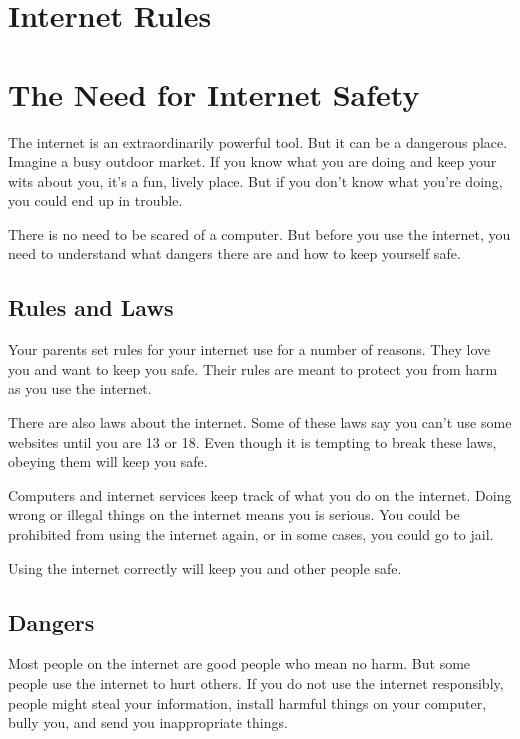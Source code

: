 
\chapter{Internet Rules}



\chapter{The Need for Internet Safety}


The internet is an extraordinarily powerful tool. But it can be a dangerous place. Imagine a busy outdoor market. If you know what you are doing and keep your wits about you, it's a fun, lively place. But if you don't know what you're doing, you could end up in trouble.

There is no need to be scared of a computer. But before you use the internet, you need to understand what dangers there are and how to keep yourself safe.

\section*{Rules and Laws}

Your parents set rules for your internet use for a number of reasons. They love you and want to keep you safe. Their rules are meant to protect you from harm as you use the internet.

There are also laws about the internet. Some of these laws say you can't use some websites until you are 13 or 18. Even though it is tempting to break these laws, obeying them will keep you safe.

Computers and internet services keep track of what you do on the internet. Doing wrong or illegal things on the internet means you is serious. You could be prohibited from using the internet again, or in some cases, you could go to jail.

Using the internet correctly will keep you and other people safe.

\section*{Dangers}

Most people on the internet are good people who mean no harm. But some people use the internet to hurt others. If you do not use the internet responsibly, people might steal your information, install harmful things on your computer, bully you, and send you inappropriate things.

